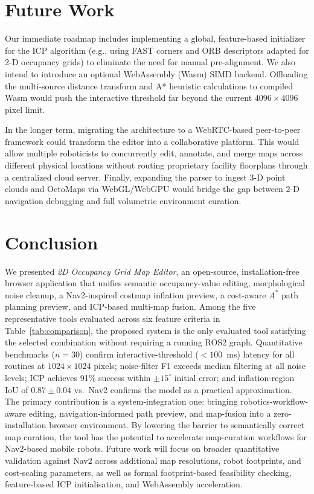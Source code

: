 \documentclass[journal]{IEEEtran}
\begin{document}
\section{Future Work}
\label{sec:future_work}
Our immediate roadmap includes implementing a global, feature-based initializer for the ICP algorithm (e.g., using FAST corners and ORB descriptors adapted for 2-D occupancy grids) to eliminate the need for manual pre-alignment. We also intend to introduce an optional WebAssembly (Wasm) SIMD backend. Offloading the multi-source distance transform and A* heuristic calculations to compiled Wasm would push the interactive threshold far beyond the current $4096\times4096$ pixel limit.

In the longer term, migrating the architecture to a WebRTC-based peer-to-peer framework could transform the editor into a collaborative platform. This would allow multiple roboticists to concurrently edit, annotate, and merge maps across different physical locations without routing proprietary facility floorplans through a centralized cloud server. Finally, expanding the parser to ingest 3-D point clouds and OctoMaps via WebGL/WebGPU would bridge the gap between 2-D navigation debugging and full volumetric environment curation.

\section{Conclusion}
We presented \emph{2D Occupancy Grid Map Editor}, an open-source, installation-free browser application that unifies semantic occupancy-value editing, morphological noise cleanup, a Nav2-inspired costmap inflation preview, a cost-aware $A^{*}$ path planning preview, and ICP-based multi-map fusion. Among the five representative tools evaluated across six feature criteria in Table~\ref{tab:comparison}, the proposed system is the only evaluated tool satisfying the selected combination without requiring a running ROS2 graph. Quantitative benchmarks ($n=30$) confirm interactive-threshold ($<\!100$~ms) latency for all routines at $1024\times1024$ pixels; noise-filter F1 exceeds median filtering at all noise levels; ICP achieves 91\% success within $\pm15^\circ$ initial error; and inflation-region IoU of $0.87\pm0.04$ vs.\ Nav2 confirms the model as a practical approximation. The primary contribution is a system-integration one: bringing robotics-workflow-aware editing, navigation-informed path preview, and map-fusion into a zero-installation browser environment. By lowering the barrier to semantically correct map curation, the tool has the potential to accelerate map-curation workflows for Nav2-based mobile robots. Future work will focus on broader quantitative validation against Nav2 across additional map resolutions, robot footprints, and cost-scaling parameters, as well as formal footprint-based feasibility checking, feature-based ICP initialisation, and WebAssembly acceleration.
\end{document}
